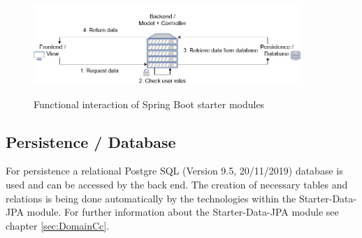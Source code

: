 \begin{figure}[H]
	\centering
	\includegraphics[width=0.9\textwidth]{Content/Domain/BackendDetails.png}
	\caption{Functional interaction of Spring Boot starter modules}
	\cite{own representation}
	\label{fig:backenddetails}
\end{figure}

\subsection{Persistence / Database}
\label{sec:DomainCd}

For persistence a relational Postgre \acs{SQL} (Version 9.5, 20/11/2019) database is used and can be accessed by the back end. 
The creation of necessary tables and relations is being done automatically by the technologies within the Starter-Data-\ac{JPA} module. For further information about the Starter-Data-\ac{JPA} module see chapter \ref{sec:DomainCc}.

